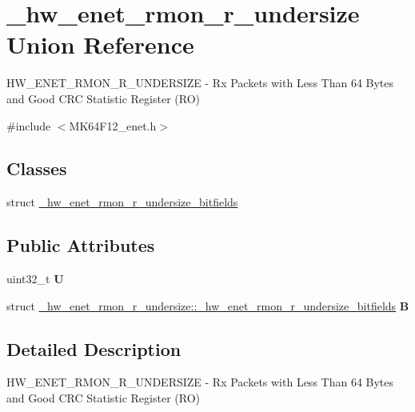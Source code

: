 \hypertarget{union__hw__enet__rmon__r__undersize}{}\section{\+\_\+hw\+\_\+enet\+\_\+rmon\+\_\+r\+\_\+undersize Union Reference}
\label{union__hw__enet__rmon__r__undersize}


H\+W\+\_\+\+E\+N\+E\+T\+\_\+\+R\+M\+O\+N\+\_\+\+R\+\_\+\+U\+N\+D\+E\+R\+S\+I\+ZE -\/ Rx Packets with Less Than 64 Bytes and Good C\+RC Statistic Register (RO)  




{\ttfamily \#include $<$M\+K64\+F12\+\_\+enet.\+h$>$}

\subsection*{Classes}
\begin{DoxyCompactItemize}
\item 
struct \hyperlink{struct__hw__enet__rmon__r__undersize_1_1__hw__enet__rmon__r__undersize__bitfields}{\+\_\+hw\+\_\+enet\+\_\+rmon\+\_\+r\+\_\+undersize\+\_\+bitfields}
\end{DoxyCompactItemize}
\subsection*{Public Attributes}
\begin{DoxyCompactItemize}
\item 
uint32\+\_\+t {\bfseries U}\hypertarget{union__hw__enet__rmon__r__undersize_a6650f8085523c1d6988d7eeab78aae4c}{}\label{union__hw__enet__rmon__r__undersize_a6650f8085523c1d6988d7eeab78aae4c}

\item 
struct \hyperlink{struct__hw__enet__rmon__r__undersize_1_1__hw__enet__rmon__r__undersize__bitfields}{\+\_\+hw\+\_\+enet\+\_\+rmon\+\_\+r\+\_\+undersize\+::\+\_\+hw\+\_\+enet\+\_\+rmon\+\_\+r\+\_\+undersize\+\_\+bitfields} {\bfseries B}\hypertarget{union__hw__enet__rmon__r__undersize_a58ddd1db1608ba2e9dc4a79d8ecbed66}{}\label{union__hw__enet__rmon__r__undersize_a58ddd1db1608ba2e9dc4a79d8ecbed66}

\end{DoxyCompactItemize}


\subsection{Detailed Description}
H\+W\+\_\+\+E\+N\+E\+T\+\_\+\+R\+M\+O\+N\+\_\+\+R\+\_\+\+U\+N\+D\+E\+R\+S\+I\+ZE -\/ Rx Packets with Less Than 64 Bytes and Good C\+RC Statistic Register (RO) 


